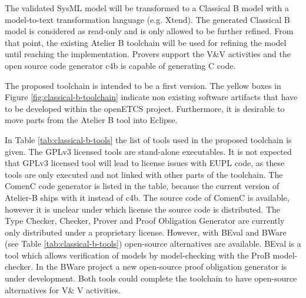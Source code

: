 The validated SysML model will be transformed to a Classical B model
with a model-to-text transformation language (e.g. Xtend). The
generated Classical B model is considered as read-only and is only
allowed to be further refined. From that point, the existing Atelier B
toolchain will be used for refining the model until reaching the
implementation. Provers support the V\&V activities and the open
source code generator c4b is capable of generating C code.

The proposed toolchain is intended to be a first version. The yellow
boxes in Figure \ref{fig:classical-b-toolchain} indicate non existing
software artifacts that have to be developed within the openETCS
project. Furthermore, it is desirable to move parts from the Atelier B
tool into Eclipse. 

In Table \ref{tab:classical-b-tools} the list of tools used in the
proposed toolchain is given. The GPLv3 licensed tools are stand-alone
executables. It is not expected that GPLv3 licensed tool will lead to
license issues with EUPL code, as these tools are only executed and
not linked with other parts of the toolchain. The ComenC code
generator is listed in the table, because the current version of
Atelier-B ships with it instead of c4b. The source code of ComenC is
available, however it is unclear under which license the source code
is distributed. The Type Checker, Checker, Prover and Proof Obligation
Generator are currently only distributed under a proprietary
license. However, with BEval and BWare (see Table
\ref{tab:classical-b-tools}) open-source alternatives are
available. BEval is a tool which allows verification of models by
model-checking with the ProB model-checker. In the BWare project a new
open-source proof obligation generator is under development. Both
tools could complete the toolchain to have open-source alternatives
for V\& V activities.

